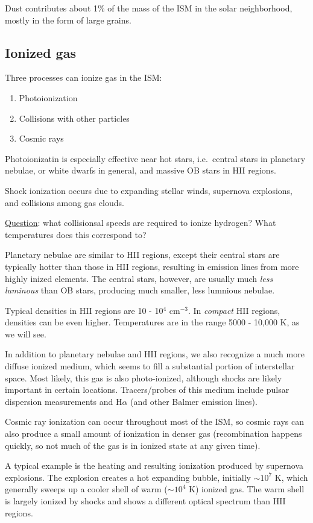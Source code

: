 \documentclass[11pt]{article}
\newcommand{\mar}[1]{\hspace{0pt}\marginpar{-\textcolor{black}{#1}-}}
\begin{document}
Dust contributes about 1\% of the mass of the ISM in the solar neighborhood,
mostly in the form of large grains.

\subsection{Ionized gas}
Three processes can ionize gas in the ISM:
\begin{enumerate}[label=\alph*)]
    \item Photoionization
    \item Collisions with other particles
    \item Cosmic rays
\end{enumerate}
Photoionizatin is especially effective near hot stars, i.e.\ central stars
in planetary nebulae, or white dwarfs in general, and massive OB stars in
HII regions.

Shock ionization occurs due to expanding stellar winds, supernova explosions,
and collisions among gas clouds.

\underline{Question}: what collisionsal speeds are required to ionize hydrogen?
What temperatures does this correspond to?

Planetary nebulae are similar to HII regions, except their central stars are
typically hotter than those in HII regions, resulting in emission lines from
more highly inized elements.
\mar{10}The central stars, however, are usually much \emph{less luminous} than
OB stars, producing much smaller, less lumnious nebulae.

Typical densities in HII regions are 10 - 10$^{4}$ cm$^{-3}$. In \textit{compact}
HII regions, densities can be even higher. Temperatures are in the range
5000 - 10,000 K, as we will see.

In addition to planetary nebulae and HII regions, we also recognize a much more
diffuse ionized medium, which seems to fill a substantial portion of interstellar
space. Most likely, this gas is also photo-ionized, although shocks are likely
important in certain locations. Tracers/probes of this medium include pulsar
dispersion measurements and H$\alpha$ (and other Balmer emission lines).

Cosmic ray ionization can occur throughout most of the ISM, so cosmic rays can
also produce a small amount of ionization in denser gas (recombination happens
quickly, so not much of the gas is in ionized state at any given time).

\mar{11}A typical example is the heating and resulting ionization produced by
supernova explosions. The explosion creates a hot expanding bubble, initially
$\sim 10^{7}$ K, which generally sweeps up a cooler shell of warm ($\sim
10^{4}$ K) ionized gas. The warm shell is largely ionized by shocks and shows a
different optical spectrum than HII regions.
\end{document}

